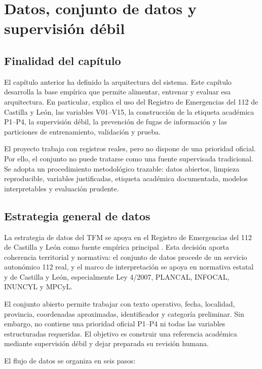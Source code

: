 \chapter{Datos, conjunto de datos y supervisión débil}
\label{cap:7}

\section{Finalidad del capítulo}

El capítulo anterior ha definido la arquitectura del sistema. Este capítulo desarrolla la base empírica que permite alimentar, entrenar y evaluar esa arquitectura. En particular, explica el uso del Registro de Emergencias del 112 de Castilla y León, las variables V01--V15, la construcción de la etiqueta académica P1--P4, la supervisión débil, la prevención de fugas de información y las particiones de entrenamiento, validación y prueba.

El proyecto trabaja con registros reales, pero no dispone de una prioridad oficial. Por ello, el conjunto no puede tratarse como una fuente supervisada tradicional. Se adopta un procedimiento metodológico trazable: datos abiertos, limpieza reproducible, variables justificadas, etiqueta académica documentada, modelos interpretables y evaluación prudente.

\section{Estrategia general de datos}

La estrategia de datos del TFM se apoya en el Registro de Emergencias del 112 de Castilla y León como fuente empírica principal \cite{Registro112CyL}. Esta decisión aporta coherencia territorial y normativa: el conjunto de datos procede de un servicio autonómico 112 real, y el marco de interpretación se apoya en normativa estatal y de Castilla y León, especialmente Ley 4/2007, PLANCAL, INFOCAL, INUNCYL y MPCyL.

El conjunto abierto permite trabajar con texto operativo, fecha, localidad, provincia,
coordenadas aproximadas, identificador y categoría preliminar. Sin embargo, no
contiene una prioridad oficial P1--P4 ni todas las variables estructuradas requeridas.
El objetivo es construir una referencia académica mediante supervisión débil y
dejar preparada su revisión humana.

El flujo de datos se organiza en seis pasos:

